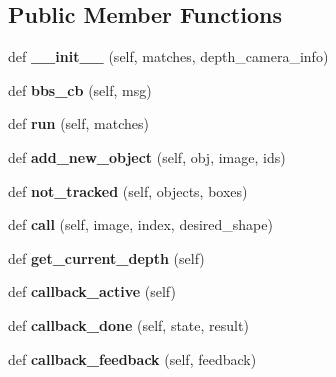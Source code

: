 \subsection*{Public Member Functions}
\begin{DoxyCompactItemize}
\item 
\mbox{\label{classdarknet__tracker_1_1DarknetTracker_aab02e22e86945279aa9ca5e1aa0137c8}} 
def {\bfseries \+\_\+\+\_\+init\+\_\+\+\_\+} (self, matches, depth\+\_\+camera\+\_\+info)
\item 
\mbox{\label{classdarknet__tracker_1_1DarknetTracker_a3c258261c3e1844490b165b5f65592f7}} 
def {\bfseries bbs\+\_\+cb} (self, msg)
\item 
\mbox{\label{classdarknet__tracker_1_1DarknetTracker_a32502ffe6e3a0091f50806ecd4035d43}} 
def {\bfseries run} (self, matches)
\item 
\mbox{\label{classdarknet__tracker_1_1DarknetTracker_ad55ec969987a3b8d7c442465b986648e}} 
def {\bfseries add\+\_\+new\+\_\+object} (self, obj, image, ids)
\item 
\mbox{\label{classdarknet__tracker_1_1DarknetTracker_aff898ae364094827e7847e0108206874}} 
def {\bfseries not\+\_\+tracked} (self, objects, boxes)
\item 
\mbox{\label{classdarknet__tracker_1_1DarknetTracker_afe95d886b7076b50c75d7053f0f9249b}} 
def {\bfseries call} (self, image, index, desired\+\_\+shape)
\item 
\mbox{\label{classdarknet__tracker_1_1DarknetTracker_a7a35e37a3105a5a5749142a8d205ba1d}} 
def {\bfseries get\+\_\+current\+\_\+depth} (self)
\item 
\mbox{\label{classdarknet__tracker_1_1DarknetTracker_a84c45be7cdb305f5604d1d760c1e3de8}} 
def {\bfseries callback\+\_\+active} (self)
\item 
\mbox{\label{classdarknet__tracker_1_1DarknetTracker_a073c559b227cad229c89113eec7c50ef}} 
def {\bfseries callback\+\_\+done} (self, state, result)
\item 
\mbox{\label{classdarknet__tracker_1_1DarknetTracker_a96c460c47c8e25aa4d39077fcca71917}} 
def {\bfseries callback\+\_\+feedback} (self, feedback)
\end{DoxyCompactItemize}
